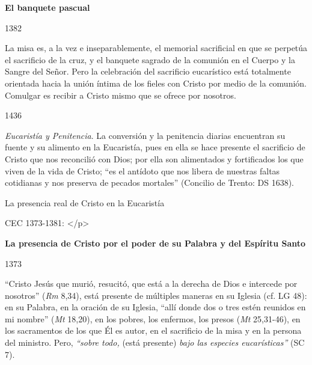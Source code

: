 			\begin{ccebody}\textbf{El banquete pascual}\end{ccebody}
			
			\begin{ccebody}\begin{ccenumber}1382\end{ccenumber} La misa es, a la vez e inseparablemente, el memorial sacrificial en que se perpetúa el sacrificio de la cruz, y el banquete sagrado de la comunión en el Cuerpo y la Sangre del Señor. Pero la celebración del sacrificio eucarístico está totalmente orientada hacia la unión íntima de los fieles con Cristo por medio de la comunión. Comulgar es recibir a Cristo mismo que se ofrece por nosotros.\end{ccebody}
			
			\begin{ccebody}\begin{ccenumber}1436\end{ccenumber} \textit{Eucaristía y Penitencia}. La conversión y la penitencia diarias encuentran su fuente y su alimento en la Eucaristía, pues en ella se hace presente el sacrificio de Cristo que nos reconcilió con Dios; por ella son alimentados y fortificados los que viven de la vida de Cristo; “es el antídoto que nos libera de nuestras faltas cotidianas y nos preserva de pecados mortales” (Concilio de Trento: DS 1638).\end{ccebody}
			
			\begin{ccetheme}La presencia real de Cristo en la Eucaristía \end{ccetheme}
			
			\begin{ccereference}\end{ccereference}CEC 1373-1381: </p>
			
			\begin{ccebody}\textbf{La presencia de Cristo por el poder de su Palabra y del Espíritu Santo}\end{ccebody}
			
			\begin{ccebody}\begin{ccenumber}1373\end{ccenumber} “Cristo Jesús que murió, resucitó, que está a la derecha de Dios e intercede por nosotros” (\textit{Rm} 8,34), está presente de múltiples maneras en su Iglesia (cf. LG 48): en su Palabra, en la oración de su Iglesia, “allí donde dos o tres estén reunidos en mi nombre” (\textit{Mt} 18,20), en los pobres, los enfermos, los presos (\textit{Mt} 25,31-46), en los sacramentos de los que Él es autor, en el sacrificio de la misa y en la persona del ministro. Pero, \textit{“sobre todo,} (está presente) \textit{bajo las especies eucarísticas”} (SC 7).\end{ccebody}
			
